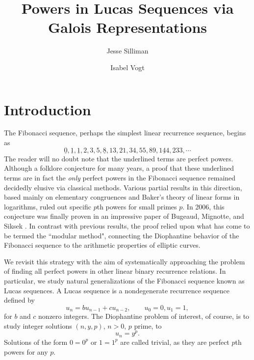 \documentclass[12pt]{amsart}
\theoremstyle{definition}
\theoremstyle{remark}
\begin{document}
\title{Powers in Lucas Sequences via Galois Representations}
\author{Jesse Silliman}
\address{262 Orchard Road, Paoli, PA 19301 }
\author{Isabel Vogt}
\address{1328 Mulberry Way, Boca Raton, FL 33486}


\maketitle


\section{Introduction}
The Fibonacci sequence, perhaps the simplest linear recurrence sequence, begins as \[\underline{0},\underline{1},\underline{1},2,3,5,\underline{8},13,21,34,55,89,\underline{144},233, \cdots\] The reader will no doubt note that the underlined terms are perfect powers. Although a folklore conjecture for many years, a proof that these underlined terms are in fact the \emph{only} perfect powers in the Fibonacci sequence remained decidedly elusive via classical methods. Various partial results in this direction, based mainly on elementary congruences and Baker's theory of linear forms in logarithms, ruled out specific $p$th powers for small primes $p$. In 2006, this conjecture was finally proven in an impressive paper of Bugeaud, Mignotte, and Siksek \cite{siksek06}. In contrast with previous results, the proof relied upon what has come to be termed the ``modular method", connecting the Diophantine behavior of the Fibonacci sequence to the arithmetic properties of elliptic curves.

We revisit this strategy with the aim of systematically approaching the problem of finding all perfect powers in other linear binary recurrence relations.  In particular, we study natural generalizations of the Fibonacci sequence known as Lucas sequences.  A Lucas sequence is a nondegenerate recurrence sequence defined by 
\begin{equation} u_n = b u_{n-1} + c u_{n-2}, \qquad u_0 = 0, u_1 = 1, \end{equation} for $b$ and $c$ nonzero integers.  The Diophantine problem of interest, of course, is to study integer solutions $(n,y,p)$, $n > 0$, $p$ prime, to \begin{equation}\label{the_eqn}u_n = y^p.\end{equation}
Solutions of the form $0=0^p$ or $1 = 1^p$ are called trivial, as they are perfect $p$th powers for any $p$.   
\end{document}
